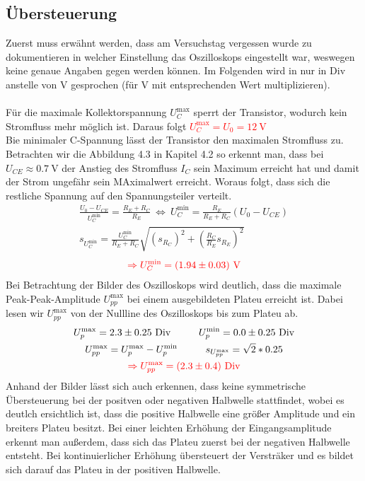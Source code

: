\subsection{Übersteuerung}
Zuerst muss erwähnt werden, dass am Versuchstag vergessen wurde zu dokumentieren in welcher Einstellung das Oszilloskops eingestellt war, weswegen keine genaue Angaben gegen werden können. Im Folgenden wird in nur in Div anstelle von V gesprochen (für V mit entsprechenden Wert multiplizieren).\\ \\
Für die maximale Kollektorspannung $U_C^{\text{max}}$ sperrt der Transistor, wodurch kein Stromfluss mehr möglich ist. Daraus folgt \textcolor{red}{$U_C^{\text{max}} = U_0 = 12~\text{V}$} \\
Bie minimaler C-Spannung lässt der Transistor den maximalen Stromfluss zu. Betrachten wir die Abbildung 4.3 in Kapitel 4.2 so erkennt man, dass bei $U_{CE}\approx 0.7~\text{V}$ der Anstieg des Stromfluss $I_C$ sein Maximum erreicht hat und damit der Strom ungefähr sein MAximalwert erreicht. Woraus folgt, dass sich die restliche Spannung auf den Spannungsteiler verteilt.
\begin{gather}
    \frac{U_0-U_{CE}}{U_C^\text{min}} = \frac{R_E+R_C}{R_E}~\Leftrightarrow~U_C^\text{min}= \frac{R_E}{R_E+R_C}(U_0-U_{CE})\\
    s_{U_C^\text{min}} = \frac{U_C^\text{min}}{R_E+R_C}\sqrt{(s_{R_C})^2+\left(\frac{R_C}{R_E}s_{R_E}\right)^2}
\end{gather}
\begin{align*}
    \textcolor{red}{\Rightarrow U_C^\text{min}=(1.94 \pm 0.03)~\text{V}}
\end{align*}
Bei Betrachtung der Bilder des Oszilloskops wird deutlich, dass die maximale Peak-Peak-Amplitude $U_{pp}^\text{max}$ bei einem ausgebildeten Plateu erreicht ist. Dabei lesen wir $U_{pp}^\text{max}$ von der Nullline des Oszilloskops bis zum Plateu ab.
\begin{gather*}
    U_p^\text{max}=2.3 \pm 0.25~\text{Div} \tab U_p^\text{min}=0.0\pm0.25~\text{Div}\\
    U_{pp}^\text{max} = U_p^\text{max}-U_p^\text{min} \tab s_{U_{pp}^\text{max}}=\sqrt{2}*0.25\\
    \textcolor{red}{\Rightarrow U_{pp}^\text{max}=(2.3 \pm 0.4)~\text{Div}}
\end{gather*}
Anhand der Bilder lässt sich auch erkennen, dass keine symmetrische Übersteuerung bei der positven oder negativen Halbwelle stattfindet, wobei es deutlch ersichtlich ist, dass die positive Halbwelle eine größer Amplitude und ein breiters Plateu besitzt. Bei einer leichten Erhöhung der Eingangsamplitude erkennt man außerdem, dass sich das Plateu zuerst bei der negativen Halbwelle entsteht. Bei kontinuierlicher Erhöhung übersteuert der Versträker und es bildet sich darauf das Plateu in der positiven Halbwelle.



